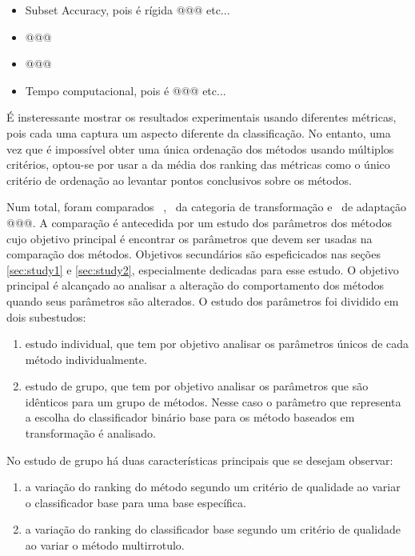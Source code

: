 \begin{itemize}
 \item Subset Accuracy, pois é rígida @@@ etc...
 \item @@@
 \item @@@
 \item Tempo computacional, pois é @@@ etc...
\end{itemize}

É insteressante mostrar os resultados experimentais usando diferentes métricas, pois cada uma captura
um aspecto diferente da classificação.
No entanto, uma vez que é impossível obter uma única ordenação dos métodos
usando múltiplos critérios,
optou-se por usar a da média dos ranking das métricas como
o único critério de ordenação ao levantar pontos conclusivos sobre os métodos. 

Num total, foram comparados \Nml~\MML, \NmlT~da categoria de transformação e \NmlA~de adaptação @@@.
A comparação é antecedida por um estudo dos parâmetros dos métodos
cujo objetivo principal é encontrar os parâmetros que devem ser usadas na comparação dos métodos. Objetivos secundários são
espeficicados nas seções \ref{sec:study1} e \ref{sec:study2}, especialmente dedicadas para esse estudo.
O objetivo principal é alcançado ao analisar a alteração do comportamento dos métodos quando seus parâmetros são alterados.
O estudo dos parâmetros foi dividido em dois subestudos:
\begin{enumerate}
 \item estudo individual, que tem por objetivo analisar os parâmetros únicos de cada método individualmente.
  \item estudo de grupo, que tem por objetivo analisar os parâmetros que são idênticos para um grupo de métodos.
  Nesse caso o parâmetro que representa a escolha do classificador binário base para os método baseados em transformação é
  analisado. 
\end{enumerate}
 No estudo de grupo há duas características principais que se desejam observar:
  
  \begin{enumerate}
  
  \item a variação do ranking do método segundo um critério de qualidade ao variar o classificador base
  para uma base específica.
  \item a variação do ranking do classificador base segundo um critério de qualidade ao variar o método multirrotulo.
  \end{enumerate}

